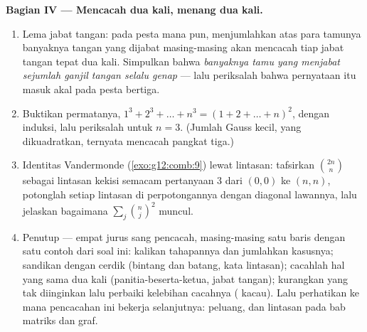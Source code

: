 \begin{problem}
\medskip
\noindent\textbf{Bagian IV --- Mencacah dua kali, menang dua kali.}
\begin{enumerate}[resume]
  \item Lema jabat tangan: pada pesta mana pun, menjumlahkan atas para tamunya
        banyaknya tangan yang dijabat masing-masing akan mencacah tiap jabat
        tangan tepat dua kali. Simpulkan bahwa \emph{banyaknya tamu
        yang menjabat sejumlah ganjil tangan selalu genap} ---
        lalu periksalah bahwa pernyataan itu masuk akal pada pesta bertiga.
  \item Buktikan permatanya,
        $1^3 + 2^3 + \dots + n^3 = (1 + 2 + \dots + n)^2$, dengan
        induksi, lalu periksalah untuk $n = 3$. (Jumlah Gauss kecil,
        yang dikuadratkan, ternyata mencacah pangkat tiga.)
  \item Identitas Vandermonde (\cref{exo:g12:comb:9}) lewat
        lintasan: tafsirkan $\binom{2n}{n}$ sebagai lintasan kekisi
        semacam pertanyaan 3 dari $(0,0)$ ke $(n,n)$, potonglah setiap
        lintasan di perpotongannya dengan diagonal lawannya, lalu jelaskan
        bagaimana $\sum_j \binom nj^2$ muncul.
  \item Penutup --- empat jurus sang pencacah, masing-masing satu baris dengan
        satu contoh dari soal ini: kalikan tahapannya dan jumlahkan
        kasusnya; sandikan dengan cerdik (bintang dan batang, kata lintasan);
        cacahlah hal yang sama dua kali (panitia-beserta-ketua,
        jabat tangan); kurangkan yang tak diinginkan lalu perbaiki
        kelebihan cacahnya ( kacau). Lalu perhatikan ke mana pencacahan
        ini bekerja selanjutnya: peluang, dan lintasan pada
        bab matriks dan graf.

\end{enumerate}
\end{problem}
